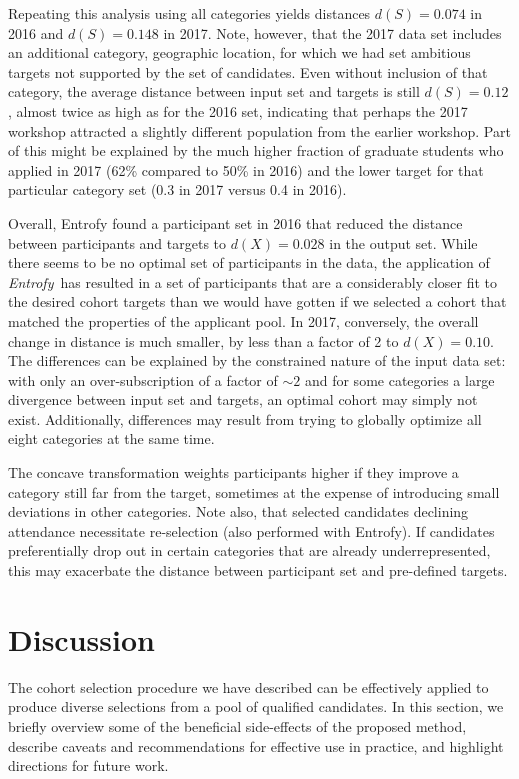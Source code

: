 \documentclass[10pt,letterpaper]{article}
\newcommand{\project}[1]{\textsl{#1}}
\newcommand{\entrofy}{\project{Entrofy}}
\begin{document}
Repeating this analysis using all categories yields distances $d(S)=0.074$ in 2016 and $d(S)=0.148$ in 2017.
Note, however, that the 2017 data set includes an additional category, geographic location, for which we had set ambitious targets not supported by the set of candidates.
Even without inclusion of that category, the average distance between input set and targets is still $d(S)=0.12$, almost twice as high as for the 2016 set, indicating that perhaps the 2017 workshop attracted a slightly different population from the earlier workshop.
Part of this might be explained by the much higher fraction of graduate students who applied in 2017 (62\% compared to 50\% in 2016) and the lower target for that particular category set (0.3 in 2017 versus 0.4 in 2016).
    
Overall, Entrofy found a participant set in 2016 that reduced the distance between participants and targets to $d(X)=0.028$ in the output set. While there seems to be no optimal set of participants in the data, the application of \entrofy\ has resulted in a set of participants that are a considerably closer fit to the desired cohort targets than we would have gotten if we selected a cohort that matched the properties of the applicant pool.
In 2017, conversely, the overall change in distance is much smaller, by less than a factor of 2 to $d(X)=0.10$.
The differences can be explained by the constrained nature of the input data set: with only an over-subscription of a factor of $\sim 2$ and for some categories a large divergence between input set and targets, an optimal cohort may simply not exist.
Additionally, differences may result from trying to globally optimize all eight categories at the same time.

The concave transformation weights participants higher if they improve a category still far from the target, sometimes at the expense of introducing small deviations in other categories.
Note also, that selected candidates declining attendance necessitate re-selection (also performed with Entrofy).
If candidates preferentially drop out in certain categories that are already underrepresented, this may exacerbate the distance between participant set and pre-defined targets.


\section*{Discussion}
\label{sec:discussion}

The cohort selection procedure we have described can be effectively applied to produce diverse selections from a pool of qualified candidates.
In this section, we briefly overview some of the beneficial side-effects of the proposed method, describe caveats and recommendations for effective use in practice, and highlight directions for future work.
\end{document}
